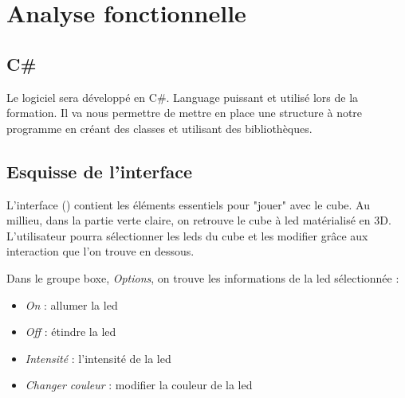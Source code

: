 \documentclass[a4paper,12pt]{article}
\begin{document}
\newpage
\section{Analyse fonctionnelle}

\subsection{C\#}
Le logiciel sera développé en C\#. Language puissant et utilisé lors de la formation. Il va nous permettre de mettre en place une structure à notre programme en créant des classes et utilisant des bibliothèques. 

\subsection{Esquisse de l'interface}

L'interface () contient les éléments essentiels pour "jouer" avec le cube. Au millieu, dans la partie verte claire, on retrouve le cube à led matérialisé en 3D. L'utilisateur pourra sélectionner les leds du cube et les modifier grâce aux interaction que l'on trouve en dessous.
\vspace{.5cm}

\noindent Dans le groupe boxe, \emph{Options}, on trouve les informations de la led sélectionnée :
\begin{itemize}
	\item \emph{On} : allumer la led
	\item \emph{Off} : étindre la led
	\item \emph{Intensité} : l'intensité de la led
	\item \emph{Changer couleur} : modifier la couleur de la led
\end{itemize}
\vspace{.5cm}
\end{document}
